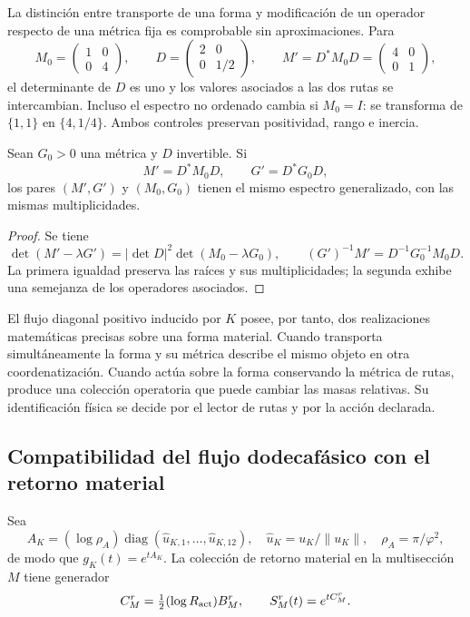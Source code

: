 La distinción entre transporte de una forma y modificación de un
operador respecto de una métrica fija es comprobable sin aproximaciones.
Para
\[
 M_0=\begin{pmatrix}1&0\\0&4\end{pmatrix},\qquad
 D=\begin{pmatrix}2&0\\0&1/2\end{pmatrix},\qquad
 M'=D^*M_0D=\begin{pmatrix}4&0\\0&1\end{pmatrix},
\]
el determinante de \(D\) es uno y los valores asociados a las dos
rutas se intercambian. Incluso el espectro no ordenado cambia si
\(M_0=I\): se transforma de \(\{1,1\}\) en \(\{4,1/4\}\).
Ambos controles preservan positividad, rango e inercia.

\begin{proposition}
Sean \(G_0>0\) una métrica y \(D\) invertible. Si
\[
 M'=D^*M_0D,\qquad G'=D^*G_0D,
\]
los pares \((M',G')\) y \((M_0,G_0)\) tienen el mismo espectro
generalizado, con las mismas multiplicidades.
\end{proposition}
\begin{proof}
Se tiene
\[
 \det(M'-\lambda G')=|\det D|^2\det(M_0-\lambda G_0),
 \qquad (G')^{-1}M'=D^{-1}G_0^{-1}M_0D.
\]
La primera igualdad preserva las raíces y sus multiplicidades; la
segunda exhibe una semejanza de los operadores asociados.
\end{proof}

El flujo diagonal positivo inducido por \(K\) posee, por tanto, dos
realizaciones matemáticas precisas sobre una forma material. Cuando
transporta simultáneamente la forma y su métrica describe el mismo
objeto en otra coordenatización. Cuando actúa sobre la forma conservando la métrica
de rutas, produce una colección operatoria que puede cambiar las masas
relativas. Su identificación física se decide por el lector de rutas y
por la acción declarada.

\subsection{Compatibilidad del flujo dodecafásico con el retorno material}

Sea
\[
 A_K=(\log\rho_A)\operatorname{diag}(\widehat u_{K,1},\ldots,
       \widehat u_{K,12}),\quad
 \widehat u_K=u_K/\|u_K\|,\quad \rho_A=\pi/\varphi^2,
\]
de modo que \(g_K(t)=e^{tA_K}\). La colección de retorno material
en la multisección \(M\) tiene generador
\[
 C_M^r=\tfrac12(\log R_{\rm act})B_M^r,\qquad
 S_M^r(t)=e^{tC_M^r}.
\]

